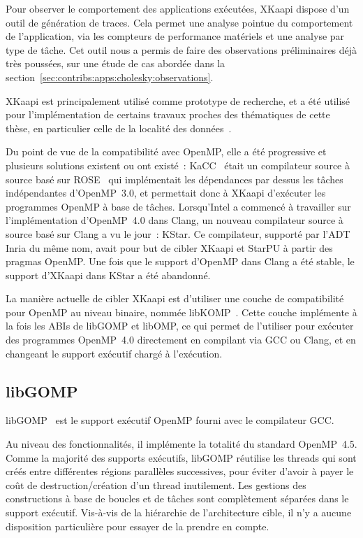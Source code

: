 Pour observer le comportement des applications exécutées, XKaapi dispose d'un outil de génération de traces.
Cela permet une analyse pointue du comportement de l'application, via les compteurs de performance matériels et une analyse par type de tâche.
Cet outil nous a permis de faire des observations préliminaires déjà très poussées, sur une étude de cas abordée dans la section~\ref{sec:contribs:apps:cholesky:observations}.

XKaapi est principalement utilisé comme prototype de recherche, et a été utilisé pour l'implémentation de certains travaux proches des thématiques de cette thèse, en particulier celle de la localité des données~\cite{Durand2013, Bleuse2014, Lima2015}.

Du point de vue de la compatibilité avec OpenMP, elle a été progressive et plusieurs solutions existent ou ont existé~: KaCC~\cite{Lementec2011} était un compilateur source à source basé sur ROSE~\cite{Quinlan2003} qui implémentait les dépendances par dessus les tâches indépendantes d'OpenMP~3.0, et permettait donc à XKaapi d'exécuter les programmes OpenMP à base de tâches.
Lorsqu'Intel a commencé à travailler sur l'implémentation d'OpenMP~4.0 dans Clang, un nouveau compilateur source à source basé sur Clang a vu le jour~: KStar.
Ce compilateur, supporté par l'ADT Inria du même nom, avait pour but de cibler XKaapi et StarPU à partir des pragmas OpenMP.
Une fois que le support d'OpenMP dans Clang a été stable, le support d'XKaapi dans KStar a été abandonné.

La manière actuelle de cibler XKaapi est d'utiliser une couche de compatibilité pour OpenMP au niveau binaire, nommée libKOMP~\cite{Broquedis2012}.
Cette couche implémente à la fois les ABIs de libGOMP et libOMP, ce qui permet de l'utiliser pour exécuter des programmes OpenMP~4.0 directement en compilant via GCC ou Clang, et en changeant le support exécutif chargé à l'exécution.



\subsection{libGOMP}

libGOMP~\cite{Novillo2006} est le support exécutif OpenMP fourni avec le compilateur GCC.

Au niveau des fonctionnalités, il implémente la totalité du standard OpenMP~4.5.
Comme la majorité des supports exécutifs, libGOMP réutilise les threads qui sont créés entre différentes régions parallèles successives, pour éviter d'avoir à payer le coût de destruction/création d'un thread inutilement.
Les gestions des constructions à base de boucles et de tâches sont complètement séparées dans le support exécutif.
Vis-à-vis de la hiérarchie de l'architecture cible, il n'y a aucune disposition particulière pour essayer de la prendre en compte.

